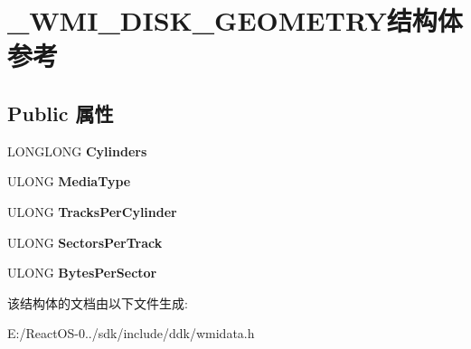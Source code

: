 \hypertarget{struct___w_m_i___d_i_s_k___g_e_o_m_e_t_r_y}{}\section{\+\_\+\+W\+M\+I\+\_\+\+D\+I\+S\+K\+\_\+\+G\+E\+O\+M\+E\+T\+R\+Y结构体 参考}
\label{struct___w_m_i___d_i_s_k___g_e_o_m_e_t_r_y}
\subsection*{Public 属性}
\begin{DoxyCompactItemize}
\item 
\mbox{\label{struct___w_m_i___d_i_s_k___g_e_o_m_e_t_r_y_add56b6361b9c92610242118c0047770e}} 
L\+O\+N\+G\+L\+O\+NG {\bfseries Cylinders}
\item 
\mbox{\label{struct___w_m_i___d_i_s_k___g_e_o_m_e_t_r_y_aca4e36d3eefc84fa31978e4e1f7bc123}} 
U\+L\+O\+NG {\bfseries Media\+Type}
\item 
\mbox{\label{struct___w_m_i___d_i_s_k___g_e_o_m_e_t_r_y_a9b24fab0021a8aef6dd96c3332f6d3bd}} 
U\+L\+O\+NG {\bfseries Tracks\+Per\+Cylinder}
\item 
\mbox{\label{struct___w_m_i___d_i_s_k___g_e_o_m_e_t_r_y_ae0da24bd08180ad8a0c1dccebd43255d}} 
U\+L\+O\+NG {\bfseries Sectors\+Per\+Track}
\item 
\mbox{\label{struct___w_m_i___d_i_s_k___g_e_o_m_e_t_r_y_aacb85e6689dfc40751d9f91e27be457f}} 
U\+L\+O\+NG {\bfseries Bytes\+Per\+Sector}
\end{DoxyCompactItemize}


该结构体的文档由以下文件生成\+:\begin{DoxyCompactItemize}
\item 
E\+:/\+React\+O\+S-\/0../sdk/include/ddk/wmidata.\+h\end{DoxyCompactItemize}
